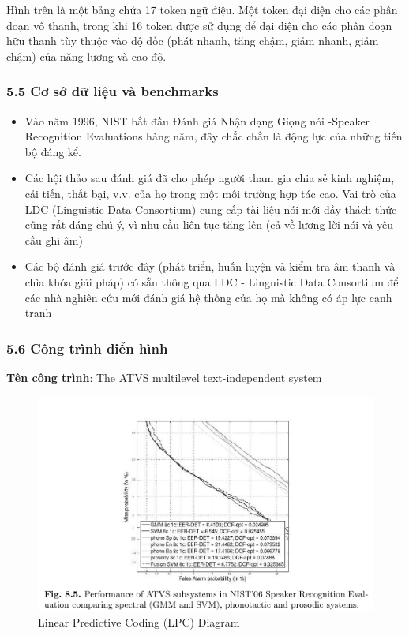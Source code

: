 \documentclass{article}
\begin{document}
	Hình trên là một bảng chứa 17 token ngữ điệu. Một token đại diện cho các phân đoạn vô thanh, trong khi 16 token được sử dụng để đại diện cho các phân đoạn hữu thanh tùy thuộc vào độ dốc (phát nhanh, tăng chậm, giảm nhanh, giảm chậm) của năng lượng và cao độ.
	
	\subsubsection{5.5 Cơ sở dữ liệu và benchmarks}
	\begin{itemize}
		\item Vào năm 1996, NIST bắt đầu Đánh giá Nhận dạng Giọng nói -Speaker Recognition Evaluations hàng năm, đây chắc chắn là động lực của những tiến bộ đáng kể.
		\item Các hội thảo sau đánh giá đã cho phép người tham gia chia sẻ kinh nghiệm, cải tiến, thất bại, v.v. của họ trong một môi trường hợp tác cao. Vai trò của LDC (Linguistic Data Consortium) cung cấp tài liệu nói mới đầy thách thức cũng rất đáng chú ý, vì nhu cầu liên tục tăng lên (cả về lượng lời nói và yêu cầu ghi âm)
		\item Các bộ đánh giá trước đây (phát triển, huấn luyện và kiểm tra âm thanh và chìa khóa giải pháp) có sẵn thông qua LDC - Linguistic Data Consortium để các nhà nghiên cứu mới đánh giá hệ thống của họ mà không có áp lực cạnh tranh
	\end{itemize}
	
	\subsubsection{5.6 Công trình điển hình}
	\textbf{Tên công trình}: The ATVS multilevel text-independent system
	\begin{figure}[H]
		\centering
		\includegraphics[width=1\linewidth]{images/figure_8_5.png}
		\caption{Linear Predictive Coding (LPC) Diagram}
		\label{fig:writing-thesis}
	\end{figure}
\end{document}
